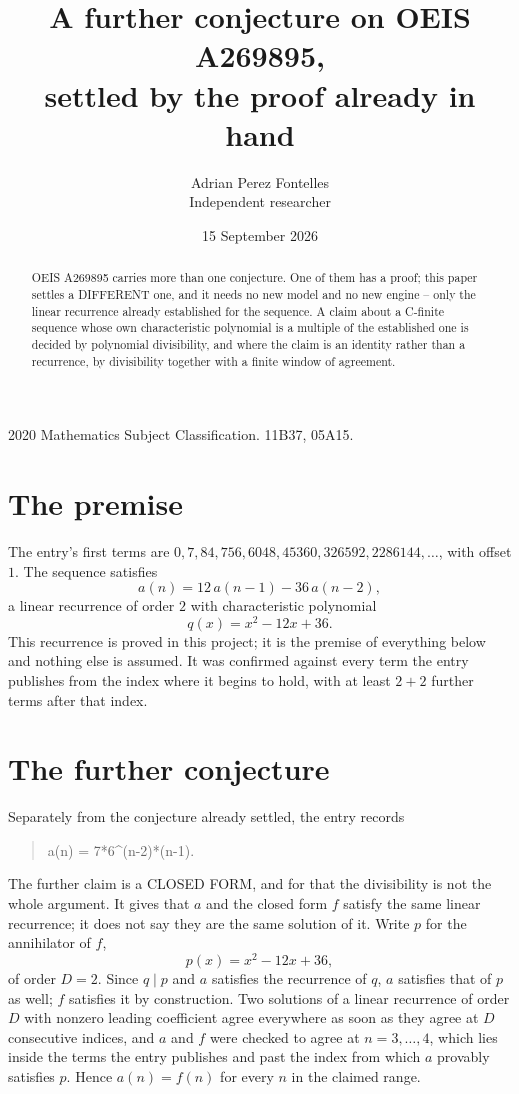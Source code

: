 \documentclass[11pt,a4paper]{article}
\title{A further conjecture on OEIS A269895,\\ \large settled by the proof already in hand}
\author{Adrian Perez Fontelles\\ \small Independent researcher}
\date{15 September 2026}
\theoremstyle{plain}
\theoremstyle{definition}
\begin{document}
\maketitle

\begin{abstract}
OEIS A269895 carries more than one conjecture. One of them has a proof; this paper settles a
DIFFERENT one, and it needs no new model and no new engine -- only the linear recurrence already
established for the sequence. A claim about a C-finite sequence whose own characteristic
polynomial is a multiple of the established one is decided by polynomial divisibility, and where
the claim is an identity rather than a recurrence, by divisibility together with a finite window
of agreement.
\end{abstract}

\noindent\small 2020 Mathematics Subject Classification. 11B37, 05A15.\normalsize

\section{The premise}

The entry's first terms are $0, 7, 84, 756, 6048, 45360, 326592, 2286144,\dots$, with offset $1$. The sequence satisfies
\[
  a(n)=12\,a(n-1) - 36\,a(n-2) ,
\]
a linear recurrence of order $2$ with characteristic polynomial
\[
  q(x)=x^{2} - 12 x + 36 .
\]
This recurrence is proved in this project; it is the premise of everything below and nothing else is assumed.
It was confirmed against every term the entry publishes from the index where it begins to hold,
with at least $2+2$ further terms after that index.

\section{The further conjecture}

Separately from the conjecture already settled, the entry records

\begin{quote}\raggedright a(n) = 7*6\^{}(n-2)*(n-1).\end{quote}

The further claim is a CLOSED FORM, and for that the divisibility is not the whole argument. It
gives that $a$ and the closed form $f$ satisfy the same linear recurrence; it does not say they
are the same solution of it. Write $p$ for the annihilator of $f$,
\[
  p(x)=x^{2} - 12 x + 36 ,
\]
of order $D=2$. Since $q\mid p$ and $a$ satisfies the recurrence of $q$, $a$ satisfies that of
$p$ as well; $f$ satisfies it by construction. Two solutions of a linear recurrence of order $D$
with nonzero leading coefficient agree everywhere as soon as they agree at $D$ consecutive
indices, and $a$ and $f$ were checked to agree at $n=3,\dots,4$,
which lies inside the terms the entry publishes and past the index from which $a$ provably
satisfies $p$. Hence $a(n)=f(n)$ for every $n$ in the claimed range.
\end{document}
